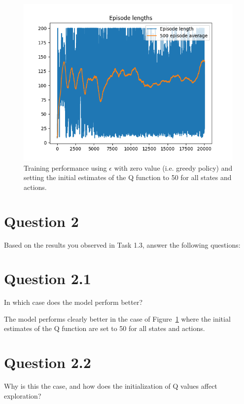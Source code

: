 \documentclass[12pt]{article}
\begin{document}
\begin{figure}[h] 
	\centering  %
    \includegraphics[width=0.9\columnwidth]{img/Figure_5_task1_3b_episode_reward.png}
	\caption{Training performance using $\epsilon$ with zero value (i.e. greedy policy) and 
	setting the initial estimates of the Q function to 50 for all states and actions.}
	\label{fig:fig5}
\end{figure}


\section*{Question 2}

Based on the results you observed in Task 1.3, answer the following questions:

\section*{Question 2.1}

In which case does the model perform better?
\newline

The model performs clearly better in the case of Figure~\ref*{fig:fig5} where 
the initial estimates of the Q function are set to 50 for all states and actions.

\section*{Question 2.2}

Why is this the case, and how does the initialization of Q values affect exploration?
\newline
\end{document}
